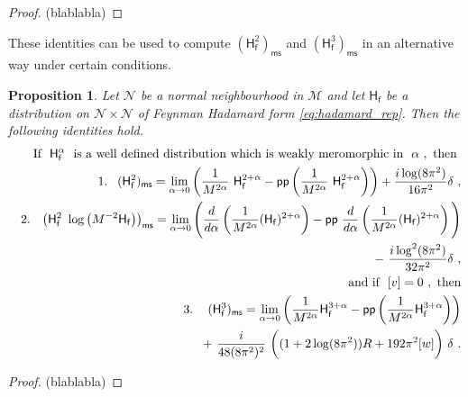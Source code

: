 \documentclass[12pt]{book}
\newcommand{\pp}{\mathsf{pp}}
\newcommand{\ms}{\mathsf{ms}}
\newcommand{\Mcal}{\mathcal{M}}
\newcommand{\Ncal}{\mathcal{N}}
\newcommand{\Hsf}{\mathsf{H}}
\newcommand{\fsf}{\mathsf{f}}
\theoremstyle{break}
\newtheorem{proposition}{Proposition}
\begin{document}
\begin{proof}
(blablabla)
\end{proof}



These identities can be used to compute $\left(\Hsf_\fsf^2\right)_\ms$ and $\left(\Hsf_\fsf^3\right)_\ms$ in an alternative way under certain conditions.


\begin{proposition}\label{prop:equivalent_scheme}
Let $\Ncal$ be a normal neighbourhood in $\Mcal$ and let $\Hsf_\fsf$ be a distribution on $\Ncal \times \Ncal$ of Feynman Hadamard form \eqref{eq:hadamard_rep}. Then the following identities hold.
%
\begin{eqnarray*}
%
&& \hspace*{-18pt} \mbox{If } \ \Hsf_\fsf^{\alpha} \ \mbox{ is a well defined distribution which is weakly meromorphic in } \ \alpha \ , \mbox{ then } \\
%
&& 1. \hspace*{8pt} (\Hsf_\fsf^2)_\ms = \lim_{\alpha\to 0} \left( \frac{1}{M^{2\alpha}} \ \Hsf_\fsf^{2+\alpha} - \pp\left(\frac{1}{M^{2\alpha}} \ \Hsf_\fsf^{2+\alpha} \right) \right) + \frac{i\log(8\pi^2)}{16\pi^2} \delta \ , \\
%
&& 2. \hspace*{8pt} \left(\Hsf_\fsf^2 \ \log \left(M^{-2}\Hsf_\fsf\right)\right)_\ms = \lim_{\alpha\to 0} \Bigg(\frac{d}{d\alpha}\left(\frac{1}{M^{2\alpha}}(\Hsf_\fsf)^{2+\alpha}\right) - \pp \ \frac{d}{d\alpha}\left(\frac{1}{M^{2\alpha}}(\Hsf_\fsf)^{2+\alpha}\right)\Bigg) \\
&& \hspace*{145pt} - \ \frac{i\log^2(8\pi^2)}{32\pi^2}\delta \ , \\
%
&& \hspace*{-18pt} \mbox{ and if } \ [v]=0 \ , \ \mbox{then} \\
%
&& 3. \hspace*{12pt} (\Hsf_\fsf^3)_\ms = \lim_{\alpha\to 0}\left(\frac{1}{M^{2\alpha}} \Hsf_\fsf^{3+\alpha} - \pp\left(\frac{1}{M^{2\alpha}} \Hsf_\fsf^{3+\alpha} \right)\right) \\
&& \hspace*{70pt} + \ \frac{i}{48(8\pi^2)^2} \ \bigg((1+2\log(8\pi^2))R+192\pi^2[w]\bigg) \ \delta \ . \\
%
\end{eqnarray*}
%
\end{proposition}


\begin{proof}
(blablabla)
\end{proof}
\end{document}
